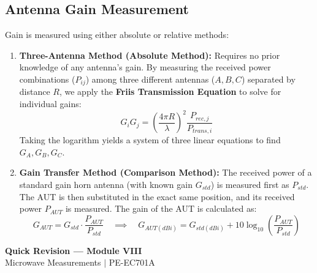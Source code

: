 \documentclass[12pt,a4paper]{article}
\begin{document}
\subsection{Antenna Gain Measurement}
Gain is measured using either absolute or relative methods:
\begin{enumerate}[leftmargin=*, itemsep=3pt]
  \item \textbf{Three-Antenna Method (Absolute Method):} Requires no prior knowledge of any antenna's gain. By measuring the received power combinations ($P_{ij}$) among three different antennas ($A, B, C$) separated by distance $R$, we apply the \textbf{Friis Transmission Equation} to solve for individual gains:
    \begin{equation}
      G_i G_j = \left( \frac{4\pi R}{\lambda} \right)^{\!2} \frac{P_{rec, j}}{P_{trans, i}}
    \end{equation}
    Taking the logarithm yields a system of three linear equations to find $G_A, G_B, G_C$.
  \item \textbf{Gain Transfer Method (Comparison Method):} The received power of a standard gain horn antenna (with known gain $G_{std}$) is measured first as $P_{std}$. The AUT is then substituted in the exact same position, and its received power $P_{AUT}$ is measured. The gain of the AUT is calculated as:
    \begin{equation}
      G_{AUT} = G_{std} \cdot \frac{P_{AUT}}{P_{std}} \quad \implies \quad G_{AUT (dBi)} = G_{std (dBi)} + 10 \log_{10}\left(\frac{P_{AUT}}{P_{std}}\right)
    \end{equation}
\end{enumerate}

\newpage
\begin{center}
  {\large\bfseries\color{myred} Quick Revision --- Module VIII}\\[3pt]
  {\small\color{mydark} Microwave Measurements $|$ PE-EC701A}
\end{center}
\noindent{\color{myred}\rule{\linewidth}{1.2pt}}
\vspace{4pt}
\end{document}
